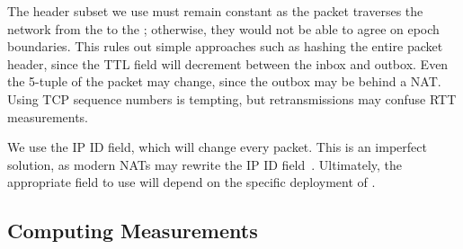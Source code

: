 

 The header subset we use must remain constant as the packet traverses the network from the \inbox to the \outbox; otherwise, they would not be able to agree on epoch boundaries. This rules out simple approaches such as hashing the entire packet header, since the TTL field will decrement between the inbox and outbox.
Even the 5-tuple of the packet may change, since the outbox may be behind a NAT.
Using TCP sequence numbers is tempting, but retransmissions may confuse RTT measurements.

We use the IP ID field, which will change every packet. This is an imperfect solution, as modern NATs may rewrite the IP ID field~\cite{ipid}.
Ultimately, the appropriate field to use will depend on the specific deployment of \name. 

\subsection{Computing Measurements}
\label{s:measure:compute}
\newcommand{\pone}{$p_{prev}$}
\newcommand{\hpone}{$h(p_{prev})$}
\newcommand{\sone}{$s_{prev}$}
\newcommand{\rone}{$r_{prev}$}
\newcommand{\ptwo}{$p_{curr}$}
\newcommand{\hptwo}{$h(p_{curr})$}
\newcommand{\stwo}{$s_{curr}$}
\newcommand{\rtwo}{$r_{curr}$}
\newcommand{\atwo}{$a_{curr}$}
\newcommand{\sentone}{$sent_{prev}$}
\newcommand{\recvdone}{$rcvd_{prev}$}
\newcommand{\senttwo}{$sent_{curr}$}
\newcommand{\recvdtwo}{$rcvd_{curr}$}


